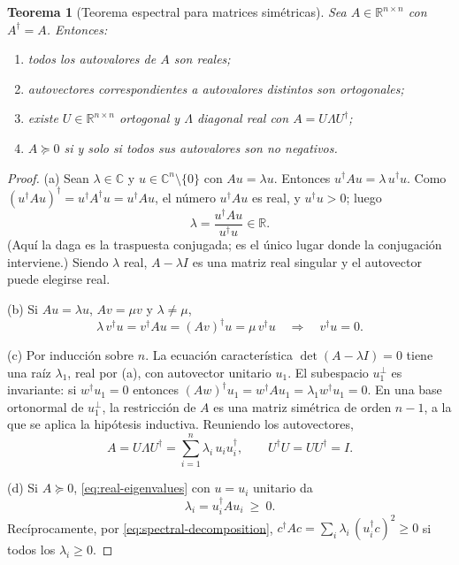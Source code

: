 \documentclass[11pt,a4paper]{article}
\newcommand{\R}{\mathbb{R}}
\newcommand{\C}{\mathbb{C}}
\newcommand{\dg}{\dagger}                         %
\theoremstyle{plain}
\newtheorem{teorema}{Teorema}[section]
\theoremstyle{definition}
\theoremstyle{remark}
\numberwithin{equation}{section}
\begin{document}
\begin{teorema}[Teorema espectral para matrices simétricas]\label{teo:espectral}
Sea $A\in\R^{n\times n}$ con $A^{\dg}=A$. Entonces:
\begin{enumerate}[label=(\alph*)]
  \item todos los autovalores de $A$ son reales;
  \item autovectores correspondientes a autovalores distintos son ortogonales;
  \item existe $U\in\R^{n\times n}$ ortogonal y $\Lambda$ diagonal real con $A=U\Lambda U^{\dg}$;
  \item $A\succeq0$ si y solo si todos sus autovalores son no negativos.
\end{enumerate}
\end{teorema}
\begin{proof}
(a) Sean $\lambda\in\C$ y $u\in\C^n\setminus\{0\}$ con $Au=\lambda u$. Entonces
$u^{\dg}Au=\lambda\,u^{\dg}u$. Como $(u^{\dg}Au)^{\dg}=u^{\dg}A^{\dg}u=u^{\dg}Au$, el número
$u^{\dg}Au$ es real, y $u^{\dg}u>0$; luego
\begin{equation}\label{eq:real-eigenvalues}
  \lambda=\frac{u^{\dg}Au}{u^{\dg}u}\in\R .
\end{equation}
(Aquí la daga es la traspuesta conjugada; es el único lugar donde la conjugación interviene.)
Siendo $\lambda$ real, $A-\lambda I$ es una matriz real singular y el autovector puede
elegirse real.

(b) Si $Au=\lambda u$, $Av=\mu v$ y $\lambda\ne\mu$,
\begin{equation}\label{eq:orthogonality}
  \lambda\,v^{\dg}u=v^{\dg}Au=(Av)^{\dg}u=\mu\,v^{\dg}u\quad\Longrightarrow\quad v^{\dg}u=0 .
\end{equation}

(c) Por inducción sobre $n$. La ecuación característica $\det(A-\lambda I)=0$ tiene una raíz
$\lambda_1$, real por (a), con autovector unitario $u_1$. El subespacio $u_1^{\perp}$ es
invariante: si $w^{\dg}u_1=0$ entonces $(Aw)^{\dg}u_1=w^{\dg}Au_1=\lambda_1w^{\dg}u_1=0$. En una
base ortonormal de $u_1^{\perp}$, la restricción de $A$ es una matriz simétrica de orden
$n-1$, a la que se aplica la hipótesis inductiva. Reuniendo los autovectores,
\begin{equation}\label{eq:spectral-decomposition}
  A=U\Lambda U^{\dg}=\sum_{i=1}^n\lambda_i\,u_iu_i^{\dg},\qquad U^{\dg}U=UU^{\dg}=I .
\end{equation}

(d) Si $A\succeq0$, \eqref{eq:real-eigenvalues} con $u=u_i$ unitario da
\begin{equation}\label{eq:rayleigh}
  \lambda_i=u_i^{\dg}Au_i\ \ge\ 0 .
\end{equation}
Recíprocamente, por \eqref{eq:spectral-decomposition},
$c^{\dg}Ac=\sum_i\lambda_i\,(u_i^{\dg}c)^2\ge0$ si todos los $\lambda_i\ge0$.
\end{proof}
\end{document}
